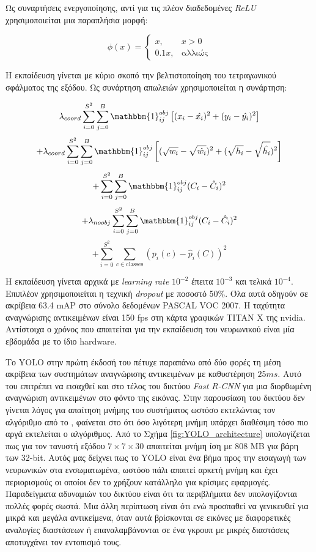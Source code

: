 Ως συναρτήσεις ενεργοποίησης, αντί για τις πλέον διαδεδομένες \textit{ReLU} χρησιμοποιείται μια παραπλήσια μορφή: 

$$
\phi(x) = \left\{ \begin{array}{cc}
    x, & x > 0 \\
    0.1 x, & \text{αλλιώς}
    \end{array}
    \right.
$$


Η εκπαίδευση γίνεται με κύριο σκοπό την βελτιστοποίηση του τετραγωνικού σφάλματος της εξόδου. Ως συνάρτηση απωλειών χρησιμοποιείται η συνάρτηση:

$$
\lambda_{coord} \sum_{i=0}^{S^2} \sum_{j=0}^{B} \mathbbm{1}_{ij}^{obj} \left[ (x_i-\hat{x_i})^2 + (y_i-\hat{y_i})^2\right]
$$
$$
   + \lambda_{coord} \sum_{i=0}^{S^2} \sum_{j=0}^{B} \mathbbm{1}_{ij}^{obj} \left[(\sqrt{w_i} - \sqrt{\hat{w_i}})^2 + (\sqrt{h_i} - \sqrt{\hat{h_i}})^2\right]
$$
$$
   + \sum_{i=0}^{S^2} \sum_{j=0}^{B} \mathbbm{1}_{ij}^{obj} (C_i - \hat{C}_i)^2
$$
$$
   + \lambda_{noobj} \sum_{i=0}^{S^2} \sum_{j=0}^{B} \mathbbm{1}_{ij}^{obj} (C_i - \hat{C}_i)^2
$$
$$
 + \sum_{i=0}^{S^2} \sum_{c \in \text{classes}} (p_{i}(c) - \hat{p}_{i}(C))^2
$$

Η εκπαίδευση γίνεται αρχικά με \textit{learning rate} $10^{-2}$ έπειτα $10^{-3}$ και τελικά $10^{-4}$. Επιπλέον χρησιμοποιείται η τεχνική \textit{dropout} \cite{3} με ποσοστό 50\%. Όλα αυτά οδηγούν σε ακρίβεια 63.4 mAP στο σύνολο δεδομένων PASCAL VOC 2007.
Η ταχύτητα αναγνώρισης αντικειμένων είναι 150 fps στη κάρτα γραφικών TITAN X της nvidia. Αντίστοιχα ο χρόνος που απαιτείται για την εκπαίδευση του νευρωνικού είναι μία εβδομάδα με το ίδιο hardware. 

Το YOLO στην πρώτη έκδοσή του πέτυχε παραπάνω από δύο φορές τη μέση ακρίβεια των συστημάτων αναγνώρισης αντικειμένων με καθυστέρηση $25 ms $. Αυτό του επιτρέπει να εισαχθεί και στο τέλος του δικτύου \textit{Fast R-CNN} για μια διορθωμένη αναγνώριση αντικειμένων στο φόντο της εικόνας. Στην παρουσίαση του δικτύου δεν γίνεται λόγος για απαίτηση μνήμης του συστήματος ωστόσο εκτελώντας τον αλγόριθμο από το \cite{8}, φαίνεται στο \cite{9} ότι όσο λιγότερη μνήμη υπάρχει διαθέσιμη τόσο πιο αργά εκτελείται ο αλγόριθμος. Από το Σχήμα \ref{fig:YOLO_architecture} υπολογίζεται πως για τον τανυστή εξόδου $ 7 \times 7 \times 30 $ απαιτείται μνήμη ίση με 808 MB για βάρη των 32-bit.
Αυτός μας δείχνει πως το YOLO είναι ένα βήμα προς την εισαγωγή των νευρωνικών στα ενσωματωμένα, ωστόσο πάλι απαιτεί αρκετή μνήμη και έχει περιορισμούς οι οποίοι δεν το χρήζουν κατάλληλο για κρίσιμες εφαρμογές. Παραδείγματα αδυναμιών του δικτύου είναι ότι τα περιβλήματα δεν υπολογίζονται πολλές φορές σωστά. Μια άλλη περίπτωση είναι ότι ενώ προσπαθεί να γενικευθεί για μικρά και μεγάλα αντικείμενα, όταν αυτά βρίσκονται σε εικόνες με διαφορετικές αναλογίες διαστάσεων ή επαναλαμβάνονται σε ένα γκρουπ με μικρές διαστάσεις αποτυγχάνει τον εντοπισμό τους.




